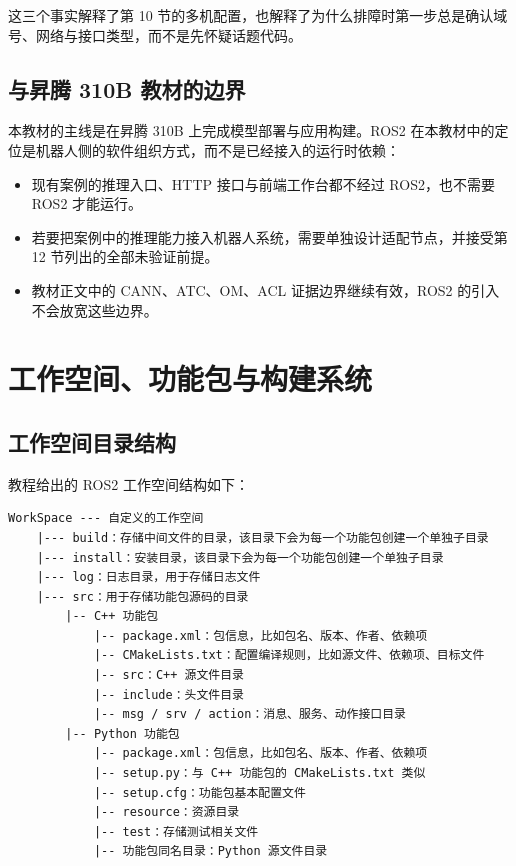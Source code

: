 这三个事实解释了第 10
节的多机配置，也解释了为什么排障时第一步总是确认域号、网络与接口类型，而不是先怀疑话题代码。

\subsection{与昇腾 310B
教材的边界}\label{ux4e0eux6607ux817e-310b-ux6559ux6750ux7684ux8fb9ux754c}

本教材的主线是在昇腾 310B 上完成模型部署与应用构建。ROS2
在本教材中的定位是机器人侧的软件组织方式，而不是已经接入的运行时依赖：

\begin{itemize}
\tightlist
\item
  现有案例的推理入口、HTTP 接口与前端工作台都不经过 ROS2，也不需要 ROS2
  才能运行。
\item
  若要把案例中的推理能力接入机器人系统，需要单独设计适配节点，并接受第
  12 节列出的全部未验证前提。
\item
  教材正文中的 CANN、ATC、OM、ACL 证据边界继续有效，ROS2
  的引入不会放宽这些边界。
\end{itemize}

\section{工作空间、功能包与构建系统}\label{ux5de5ux4f5cux7a7aux95f4ux529fux80fdux5305ux4e0eux6784ux5efaux7cfbux7edf}

\subsection{工作空间目录结构}\label{ux5de5ux4f5cux7a7aux95f4ux76eeux5f55ux7ed3ux6784}

教程给出的 ROS2 工作空间结构如下：

\begin{lstlisting}
WorkSpace --- 自定义的工作空间
    |--- build：存储中间文件的目录，该目录下会为每一个功能包创建一个单独子目录
    |--- install：安装目录，该目录下会为每一个功能包创建一个单独子目录
    |--- log：日志目录，用于存储日志文件
    |--- src：用于存储功能包源码的目录
        |-- C++ 功能包
            |-- package.xml：包信息，比如包名、版本、作者、依赖项
            |-- CMakeLists.txt：配置编译规则，比如源文件、依赖项、目标文件
            |-- src：C++ 源文件目录
            |-- include：头文件目录
            |-- msg / srv / action：消息、服务、动作接口目录
        |-- Python 功能包
            |-- package.xml：包信息，比如包名、版本、作者、依赖项
            |-- setup.py：与 C++ 功能包的 CMakeLists.txt 类似
            |-- setup.cfg：功能包基本配置文件
            |-- resource：资源目录
            |-- test：存储测试相关文件
            |-- 功能包同名目录：Python 源文件目录
\end{lstlisting}

